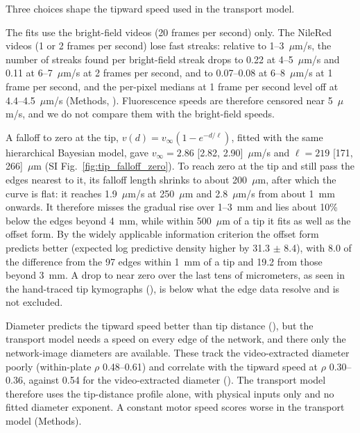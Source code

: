 Three choices shape the tipward speed used in the transport model.

The fits use the bright-field videos (20 frames per second) only.
The NileRed videos (1 or 2 frames per second) lose fast streaks: relative to 1--3~$\mu$m/s, the number of streaks found per bright-field streak drops to 0.22 at 4--5~$\mu$m/s and 0.11 at 6--7~$\mu$m/s at 2 frames per second, and to 0.07--0.08 at 6--8~$\mu$m/s at 1 frame per second, and the per-pixel medians at 1 frame per second level off at 4.4--4.5~$\mu$m/s (Methods, ).
Fluorescence speeds are therefore censored near 5~$\mu$m/s, and we do not compare them with the bright-field speeds.

A falloff to zero at the tip, $v(d) = v_\infty (1 - e^{-d/\ell})$, fitted with the same hierarchical Bayesian model, gave $v_\infty = 2.86$ [2.82, 2.90]~$\mu$m/s and $\ell = 219$ [171, 266]~$\mu$m (SI Fig.~\ref{fig:tip_falloff_zero}).
To reach zero at the tip and still pass the edges nearest to it, its falloff length shrinks to about 200~$\mu$m, after which the curve is flat: it reaches 1.9~$\mu$m/s at 250~$\mu$m and 2.8~$\mu$m/s from about 1~mm onwards.
It therefore misses the gradual rise over 1--3~mm and lies about 10\% below the edges beyond 4~mm, while within 500~$\mu$m of a tip it fits as well as the offset form.
By the widely applicable information criterion the offset form predicts better (expected log predictive density higher by 31.3 $\pm$ 8.4), with 8.0 of the difference from the 97 edges within 1~mm of a tip and 19.2 from those beyond 3~mm.
A drop to near zero over the last tens of micrometers, as seen in the hand-traced tip kymographs (), is below what the edge data resolve and is not excluded.

Diameter predicts the tipward speed better than tip distance (), but the transport model needs a speed on every edge of the network, and there only the network-image diameters are available.
These track the video-extracted diameter poorly (within-plate $\rho$ 0.48--0.61) and correlate with the tipward speed at $\rho$ 0.30--0.36, against 0.54 for the video-extracted diameter ().
The transport model therefore uses the tip-distance profile alone, with physical inputs only and no fitted diameter exponent.
A constant motor speed scores worse in the transport model (Methods).

